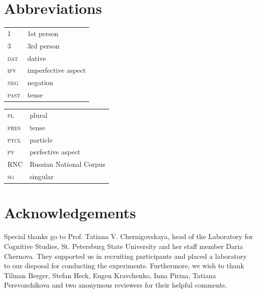 \documentclass[output=paper,colorlinks,citecolor=brown,newtxmath,hidelinks]{langscibook}
\begin{document}
\section*{Abbreviations}

\begin{tabularx}{.5\textwidth}{@{}lQ@{}}
\textsc{1}&1st person\\
\textsc{3}&3rd person\\
\textsc{dat}&{dative}\\
\textsc{ipv}&{imperfective aspect}\\
\textsc{neg}&{negation}\\
\textsc{past}&{ tense}\\
\end{tabularx}%
\begin{tabularx}{.5\textwidth}{@{}lQ@{}}
\textsc{pl}&{plural}\\
\textsc{pres}&{ tense}\\
\textsc{ptcl}&particle\\
\textsc{pv}&{perfective aspect}\\
\textsc{RNC}&{Russian} National Corpus\\
\textsc{sg}&singular\\
\end{tabularx}

\section*{Acknowledgements}
Special thanks go to Prof. Tatiana V. Chernigovskaya, head of the Laboratory for Cognitive Studies, St. Petersburg State University and her staff member Daria Chernova. They supported us in recruiting participants and placed a laboratory to our disposal for conducting the experiments. Furthermore, we wish to thank Tilman Berger, Stefan Heck, Eugen Kravchenko, Inna Pirina, Tatiana Pere\-voz\-chi\-kova and two anonymous reviewers for their helpful comments.


\end{document}
